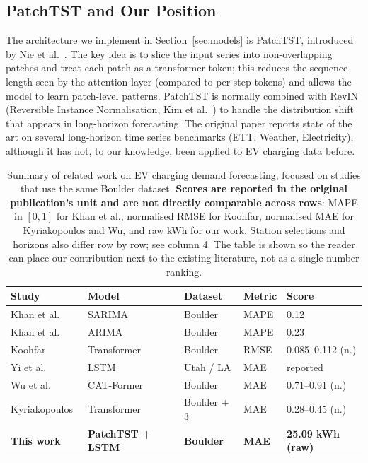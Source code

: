 \subsection{PatchTST and Our Position}

The architecture we implement in Section~\ref{sec:models} is
PatchTST, introduced by Nie et al.~\cite{nie2023patchtst}. The key
idea is to slice the input series into non-overlapping patches and
treat each patch as a transformer token; this reduces the sequence
length seen by the attention layer (compared to per-step tokens) and
allows the model to learn patch-level patterns. PatchTST is normally
combined with RevIN (Reversible Instance Normalisation,
Kim et al.~\cite{kim2022revin}) to handle the distribution shift that
appears in long-horizon forecasting. The original paper reports state
of the art on several long-horizon time series benchmarks (ETT,
Weather, Electricity), although it has not, to our knowledge, been
applied to EV charging data before.

\begin{table}[!htbp]
\centering
\caption{Summary of related work on EV charging demand forecasting,
focused on studies that use the same Boulder dataset. \textbf{Scores
are reported in the original publication's unit and are not directly
comparable across rows}: MAPE in $[0,1]$ for Khan et al., normalised
RMSE for Koohfar, normalised MAE for Kyriakopoulos and Wu, and raw
kWh for our work. Station selections and horizons also differ row by
row; see column 4. The table is shown so the reader can place our
contribution next to the existing literature, not as a single-number
ranking.}
\label{tab:related}
\setlength{\tabcolsep}{4pt}
\footnotesize
\begin{tabular}{@{}p{2.8cm}p{2.3cm}p{2.0cm}p{1.1cm}p{2.4cm}@{}}
\toprule
Study & Model & Dataset & Metric & Score \\
\midrule
Khan et al.~\cite{khan2024sarima}             & SARIMA       & Boulder      & MAPE & 0.12 \\
Khan et al.~\cite{khan2024sarima}             & ARIMA        & Boulder      & MAPE & 0.23 \\
Koohfar~\cite{koohfar2023transformer}         & Transformer  & Boulder      & RMSE & 0.085--0.112 (n.) \\
Yi et al.~\cite{yi2022lstm}                   & LSTM         & Utah / LA    & MAE  & reported \\
Wu et al.~\cite{wu2025catformer}              & CAT-Former   & Boulder      & MAE  & 0.71--0.91 (n.) \\
Kyriakopoulos~\cite{kyriakopoulos2025comparative} & Transformer & Boulder + 3 & MAE & 0.28--0.45 (n.) \\
\midrule
\textbf{This work} & \textbf{PatchTST + LSTM} & \textbf{Boulder} & \textbf{MAE} & \textbf{25.09 kWh (raw)} \\
\bottomrule
\end{tabular}
\end{table}

